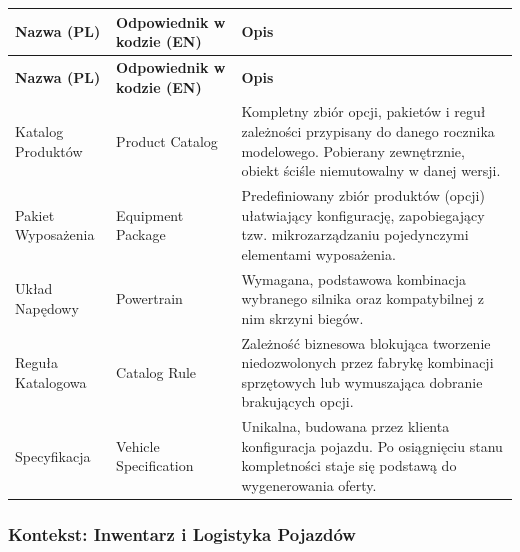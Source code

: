\begin{longtable}{|p{4cm}|p{4cm}|p{8cm}|}
\hline
\textbf{Nazwa (PL)} & \textbf{Odpowiednik w kodzie (EN)} & \textbf{Opis} \\
\hline
\endfirsthead

\hline
\textbf{Nazwa (PL)} & \textbf{Odpowiednik w kodzie (EN)} & \textbf{Opis} \\
\hline
\endhead

Katalog Produktów & Product Catalog & Kompletny zbiór opcji, pakietów i reguł zależności przypisany do danego rocznika modelowego. Pobierany zewnętrznie, obiekt ściśle niemutowalny w danej wersji. \\
\hline

Pakiet Wyposażenia & Equipment Package & Predefiniowany zbiór produktów (opcji) ułatwiający konfigurację, zapobiegający tzw. mikrozarządzaniu pojedynczymi elementami wyposażenia. \\
\hline

Układ Napędowy & Powertrain & Wymagana, podstawowa kombinacja wybranego silnika oraz kompatybilnej z nim skrzyni biegów. \\
\hline

Reguła Katalogowa & Catalog Rule & Zależność biznesowa blokująca tworzenie niedozwolonych przez fabrykę kombinacji sprzętowych lub wymuszająca dobranie brakujących opcji. \\
\hline

Specyfikacja & Vehicle Specification & Unikalna, budowana przez klienta konfiguracja pojazdu. Po osiągnięciu stanu kompletności staje się podstawą do wygenerowania oferty. \\
\hline
\end{longtable}

\subsubsection{Kontekst: Inwentarz i Logistyka Pojazdów}

